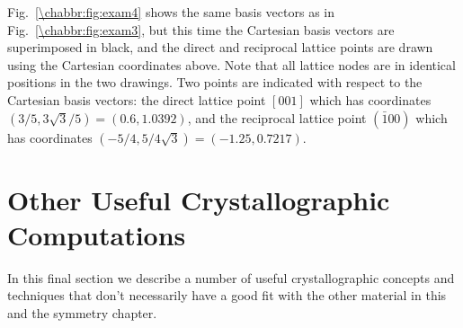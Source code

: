 \begin{example}
\[\]
Fig.~\ref{\chabbr:fig:exam4} shows the same basis vectors as in Fig.~\ref{\chabbr:fig:exam3}, but this time the Cartesian basis vectors are superimposed in black, and the direct and reciprocal lattice points are drawn using the Cartesian coordinates above.  Note that all lattice nodes are in identical positions in the two drawings.  Two points are indicated with respect to the Cartesian basis vectors: the direct lattice point $[001]$ which has coordinates $(3/5,3\sqrt{3}/5)=(0.6,1.0392)$, and the reciprocal lattice point $(\bar{1}00)$ which has coordinates $(-5/4,5/4\sqrt{3})=(-1.25,0.7217)$.
\end{example}

\section{Other Useful Crystallographic Computations}\label{\chabbr:sec:usefulcomp}
In this final section we describe a number of useful crystallographic concepts and techniques that don't necessarily have a good fit with the other material in this and the symmetry chapter.  

